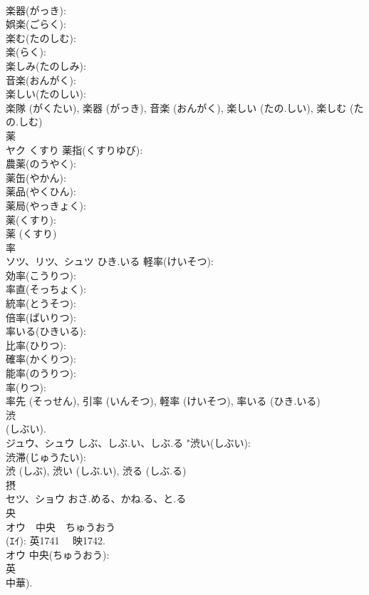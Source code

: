 \documentclass[8pt]{extreport}
\begin{document}
\begin{CJK}{UTF8}{min}
\\	楽器(がっき): 
\\	娯楽(ごらく): 
\\	楽む(たのしむ): 
\\	楽(らく): 
\\	楽しみ(たのしみ): 
\\	音楽(おんがく): 
\\	楽しい(たのしい): 
\\	楽隊 (がくたい), 楽器 (がっき), 音楽 (おんがく), 楽しい (たの.しい), 楽しむ (たの.しむ)
\\	薬			
\\	ヤク	くすり	薬指(くすりゆび): 
\\	農薬(のうやく): 
\\	薬缶(やかん): 
\\	薬品(やくひん): 
\\	薬局(やっきょく): 
\\	薬(くすり): 
\\	薬 (くすり)
\\	率			
\\	ソツ、リツ、シュツ	ひき.いる	軽率(けいそつ): 
\\	効率(こうりつ): 
\\	率直(そっちょく): 
\\	統率(とうそつ): 
\\	倍率(ばいりつ): 
\\	率いる(ひきいる): 
\\	比率(ひりつ): 
\\	確率(かくりつ): 
\\	能率(のうりつ): 
\\	率(りつ): 
\\	率先 (そっせん), 引率 (いんそつ), 軽率 (けいそつ), 率いる (ひき.いる)
\\	渋			
\\	(しぶい). 
\\	ジュウ、シュウ	しぶ、しぶ.い、しぶ.る	"渋い(しぶい): 
\\	渋滞(じゅうたい): 
\\	渋 (しぶ), 渋い (しぶ.い), 渋る (しぶ.る)
\\	摂			
\\	セツ、ショウ	おさ.める、かね.る、と.る		
\\	央			
\\	オウ　中央　ちゅうおう
\\	(ｴｲ): 英1741　 映1742.	
\\	オウ		中央(ちゅうおう): 
\\	英			
\\	中華).	

\end{CJK}
\end{document}
